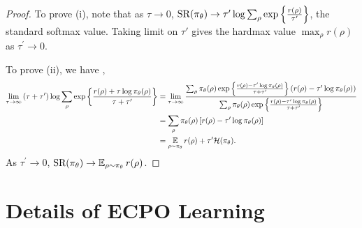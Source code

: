 \begin{proof}
To prove (i), note that as $\tau \to 0$, $\text{SR}(\pi_\theta) \to \tau^{\prime} \log{ \sum_{\rho}{ \exp\left\{ \frac{r(\rho) }{ \tau^{\prime} } \right\} }}$, the standard softmax value. Taking limit on $\tau'$ gives the hardmax value $\max_{\rho}{r(\rho)}$ as $\tau^{\prime} \to 0$.
	
To prove (ii), we have ,
\begin{align*}
	\lim\limits_{\tau \to \infty}{ (\tau + \tau^{\prime})\log{ \sum_{\rho}{ \exp\left\{ \frac{r(\rho) + \tau \log{\pi_\theta(\rho)} }{\tau + \tau^{\prime}} \right\} }} } &= {\lim\limits_{\tau \to \infty}{ \frac{ \sum_{\rho}{ \pi_\theta(\rho) \exp\left\{ \frac{r(\rho) - \tau^{\prime} \log{\pi_\theta(\rho)} }{\tau + \tau^{\prime}} \right\} \left( r(\rho) - \tau^{\prime}\log{\pi_\theta(\rho)} \right) } }{  \sum_{\rho}{ \pi_\theta(\rho) \exp\left\{ \frac{r(\rho) - \tau^{\prime} \log{\pi_\theta(\rho)} }{\tau + \tau^{\prime}} \right\} } } } }\\
	&= \sum_{\rho}{ \pi_\theta(\rho) \left[ r(\rho) - \tau^{\prime}\log{\pi_\theta(\rho)} \right] } \\
	&= \operatorname*{\mathbb{E}}_{\rho \sim \pi_\theta}{r(\rho)} + \tau^{\prime} \mathcal{H}(\pi_\theta).
\end{align*}
	As $\tau^{\prime} \to 0$, $\text{SR}(\pi_\theta) \to \operatorname*{\mathbb{E}}_{\rho \sim \pi_\theta}{r(\rho)}$.
\end{proof}

\section{Details of ECPO Learning}
\label{appx:ECPO-learning}

